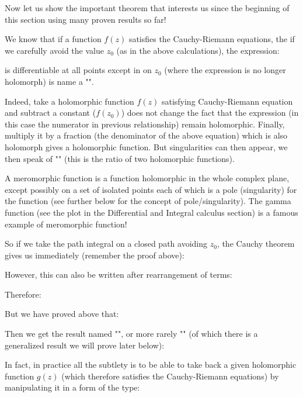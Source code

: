 	Now let us show the important theorem that interests us since the beginning of this section using many proven results so far!
	
	We know that if a function $f (z)$ satisfies the Cauchy-Riemann equations, the if we carefully avoid the value $z_0$ (as in the above calculations), the expression:
	
	is differentiable at all points except in on $z_0$ (where the expression is no longer holomorph) is name a "".

	Indeed, take a holomorphic function $f (z)$ satisfying Cauchy-Riemann equation and subtract a constant ($f(z_0)$) does not change the fact that the expression (in this case the numerator in previous relationship) remain holomorphic. Finally, multiply it by a fraction (the denominator of the above equation) which is also holomorph gives a holomorphic function. But singularities can then appear, we then speak of "" (this is the ratio of two holomorphic functions).
	\begin{tcolorbox}[title=Remark,arc=10pt,breakable,drop lifted shadow,
  skin=enhanced,
  skin first is subskin of={enhancedfirst}{arc=10pt,no shadow},
  skin middle is subskin of={enhancedmiddle}{arc=10pt,no shadow},
  skin last is subskin of={enhancedlast}{drop lifted shadow}]
	A meromorphic function is a function holomorphic in the whole complex plane, except possibly on a set of isolated points each of which is a pole (singularity) for the function (see further below for the concept of pole/singularity). The gamma function (see the plot in the Differential and Integral calculus section) is a famous example of meromorphic function!
	\end{tcolorbox}	
	So if we take the path integral on a closed path avoiding $z_0$, the Cauchy theorem gives us immediately (remember the proof above):
	
	However, this can also be written after rearrangement of terms:
	
	Therefore:
	
	But we have proved above that:
	
	Then we get the result named "", or more rarely "" (of which there is a generalized result we will prove later below):
	
	In fact, in practice all the subtlety is to be able to take back a given holomorphic function $g(z)$ (which therefore satisfies the Cauchy-Riemann equations) by manipulating it in a form of the type:
	
